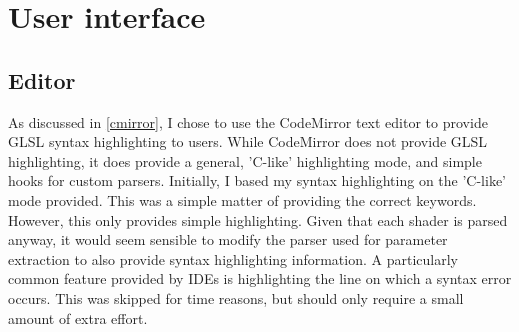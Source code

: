 \documentclass[12pt,twoside,notitlepage]{report}
\begin{document}
\section{User interface}
\subsection{Editor}
As discussed in \ref{cmirror}, I chose to use the CodeMirror text editor to provide GLSL syntax highlighting to users. While CodeMirror does not provide GLSL highlighting, it does provide a general, 'C-like' highlighting mode, and simple hooks for custom parsers. Initially, I based my syntax highlighting on the 'C-like' mode provided. This was a simple matter of providing the correct keywords. However, this only provides simple highlighting. Given that each shader is parsed anyway, it would seem sensible to modify the parser used for parameter extraction to also provide syntax highlighting information. A particularly common feature provided by IDEs is highlighting the line on which a syntax error occurs. This was skipped for time reasons, but should only require a small amount of extra effort.
\end{document}
